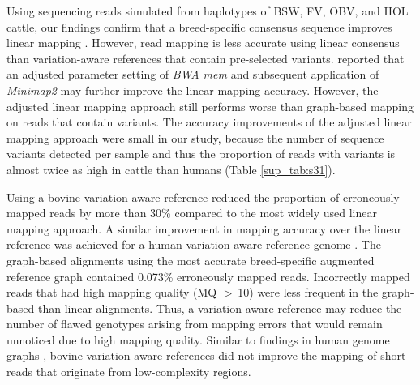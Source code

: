 \documentclass[../main.tex]{subfiles}
\begin{document}
Using sequencing reads simulated from haplotypes of BSW, FV, OBV, and HOL cattle, our findings confirm that a breed-specific consensus sequence improves linear mapping \citep{ballouz2019time,shukla2019hg19kindel}. However, read mapping is less accurate using linear consensus than variation-aware references that contain pre-selected variants. \citep{grytten2020assessing} reported that an adjusted parameter setting of \emph{BWA mem} and subsequent application of \emph{Minimap2} may further improve the linear mapping accuracy. However, the adjusted linear mapping approach still performs worse than graph-based mapping on reads that contain variants. The accuracy improvements of the adjusted linear mapping approach were small in our study, because the number of sequence variants detected per sample and thus the proportion of reads with variants is almost twice as high in cattle than humans (Table \ref{sup_tab:s31}).

Using a bovine variation-aware reference reduced the proportion of erroneously mapped reads by more than 30\% compared to the most widely used linear mapping approach. A similar improvement in mapping accuracy over the linear reference was achieved for a human variation-aware reference genome \citep{pritt2018forge}. The graph-based alignments using the most accurate breed-specific augmented reference graph contained 0.073\% erroneously mapped reads. Incorrectly mapped reads that had high mapping quality (MQ $>$ 10) were less frequent in the graph-based than linear alignments. Thus, a variation-aware reference may reduce the number of flawed genotypes arising from mapping errors that would remain unnoticed due to high mapping quality. Similar to findings in human genome graphs \citep{pritt2018forge,hickey2020genotyping}, bovine variation-aware references did not improve the mapping of short reads that originate from low-complexity regions.
\end{document}
